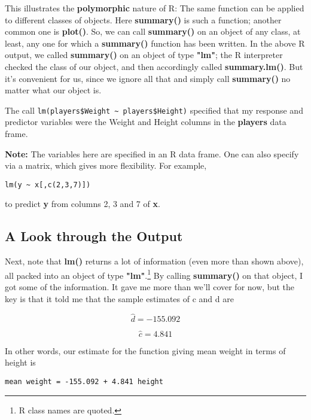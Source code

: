 \label{asterisksexample}

This illustrates the {\bf polymorphic} nature of R:  The same
function can be applied to different classes of objects.  Here {\bf
summary()} is such a function; another common one is {\bf plot()}.  So,
we can call {\bf summary()} on an object of any class, at least, any one
for which a {\bf summary()} function has been written.  In the above R
output, we called {\bf summary()} on an object of type {\bf "lm"}; the R
interpreter checked the class of our object, and then accordingly called
{\bf summary.lm()}.  But it's convenient for us, since we ignore all
that and simply call {\bf summary()} no matter what our object is.

The call \lstinline{lm(players$Weight ~ players$Height)} specified that
my response and predictor variables were the Weight and Height columns
in the {\bf players} data frame.  

{\bf Note:}  The variables here are specified in an R data frame.  One
can also specify via a matrix, which gives more flexibility.  For
example, 

\begin{lstlisting}
lm(y ~ x[,c(2,3,7)])
\end{lstlisting}

to predict {\bf y} from columns 2, 3 and 7 of {\bf x}.

\subsection{A Look through the Output}

Next, note that {\bf lm()} returns a lot of information (even more than
shown above), all packed into an object of type {\bf "lm"}.\footnote{R
class names are quoted.}  By calling {\bf summary()} on that object, I
got some of the information.  It gave me more than we'll cover for
now, but the key is that it told me that the sample estimates of c and d
are 

\begin{equation}
\hat{d} = -155.092
\end{equation}

\begin{equation}
\hat{c} = 4.841
\end{equation}

In other words, our estimate for the function giving mean weight in
terms of height is

\begin{lstlisting}
mean weight = -155.092 + 4.841 height
\end{lstlisting} 


